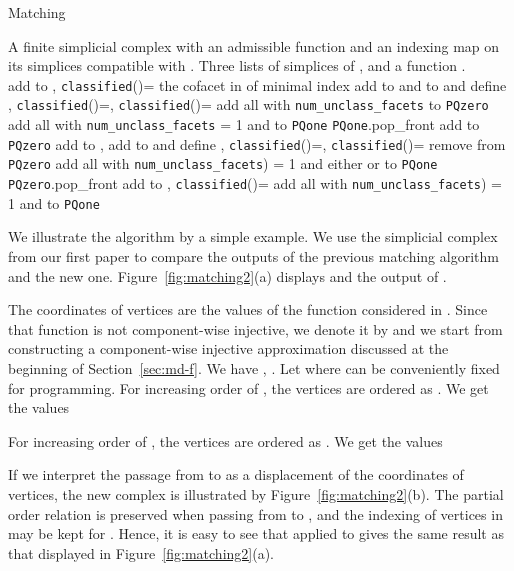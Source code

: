 \documentclass[12pt]{article}
\begin{document}
\begin{algorithm}[H]
\caption{Matching}
\label{alg-match}
\begin{algorithmic}[1]
 A finite simplicial complex  with an admissible function 
and an indexing map  on its simplices compatible with .
 Three lists  of simplices of , and a function .\\
\STATE 
{}
\STATE add  to , \texttt{classified}()=\TRUE
\ELSE
\STATE  the cofacet in  of minimal index 
\STATE add  to  and  to  and define , \texttt{classified}()=\TRUE, \texttt{classified}()=\TRUE
\STATE add all   with \texttt{{num}\_{unclass}\_{facets}} to \texttt{PQzero}
\STATE add all   with \texttt{{num}\_{unclass}\_{facets}} = 1 and   to \texttt{PQone}
\STATE  \texttt{PQone}.pop\_front
\STATE add  to \texttt{PQzero}
\ELSE
\STATE add  to , add  to  and define ,
\texttt{classified}()=\TRUE, \texttt{classified}()=\TRUE
\STATE remove  from \texttt{PQzero}
\STATE add all   with \texttt{{num}\_{unclass}\_{facets}}) = 1 and
either  or  to \texttt{PQone}
\ENDIF
\ENDWHILE
{}
\STATE  \texttt{PQzero}.pop\_front
\STATE add  to , \texttt{classified}()=\TRUE
\STATE add all   with \texttt{{num}\_{unclass}\_{facets}}) = 1 and
 to \texttt{PQone}
\ENDIF
\ENDWHILE
\ENDIF
\ENDIF
\ENDFOR
\end{algorithmic}
\end{algorithm}


We illustrate the algorithm by a simple example. We use the simplicial complex  from our first paper \cite[Figure 2]{AlKaLa17} to compare the outputs of the previous matching algorithm and the new one. Figure~\ref{fig:matching2}(a) displays  and the output of \cite[Algorithm 6]{AlKaLa17}.

The coordinates of vertices are the values of the function considered in \cite{AlKaLa17}. Since that function is not component-wise injective, we denote it by  and we start from constructing a component-wise injective approximation  discussed at the beginning of Section~\ref{sec:md-f}. We have , . Let  where  can be conveniently fixed for programming. For increasing order of , the vertices are ordered as . We get the values

For increasing order of , the vertices are ordered as . We get the values

If we interpret the passage from  to  as a displacement of the coordinates of vertices, the new complex  is illustrated by Figure~\ref{fig:matching2}(b). The partial order relation is preserved when passing from  to , and the indexing of vertices in \cite[Figure 2]{AlKaLa17} may be kept for . Hence, it is easy to see that \cite[Algorithm 6]{AlKaLa17} applied to  gives the same result as that displayed in Figure~\ref{fig:matching2}(a).
\end{document}
